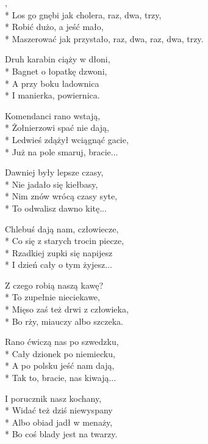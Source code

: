 \begin{lyrics}[longestline={Maszerować jak przystało, raz, dwa, raz, dwa, trzy.}]

,\\*
Los go gnębi jak cholera, raz, dwa, trzy,\\*
Robić dużo, a jeść mało,\\*
Maszerować jak przystało, raz, dwa, raz, dwa, trzy.

Druh karabin ciąży w dłoni,\\*
Bagnet o łopatkę dzwoni,\\*
A przy boku ładownica\\*
I manierka, powiernica.

Komendanci rano wstają,\\*
Żołnierzowi spać nie dają,\\*
Ledwieś zdążył wciągnąć gacie,\\*
Już na pole smaruj, bracie...

Dawniej były lepsze czasy,\\*
Nie jadało się kiełbasy,\\*
Nim znów wrócą czasy syte,\\*
To odwalisz dawno kitę...

Chlebuś dają nam, człowiecze,\\*
Co się z starych trocin piecze,\\*
Rzadkiej zupki się napijesz\\*
I dzień cały o tym żyjesz...

Z czego robią naszą kawę?\\*
To zupełnie nieciekawe,\\*
Mięso zaś też drwi z człowieka,\\*
Bo rży, miauczy albo szczeka.

Rano ćwiczą nas po szwedzku,\\*
Cały dzionek po niemiecku,\\*
A po polsku jeść nam dają,\\*
Tak to, bracie, nas kiwają...

I porucznik nasz kochany,\\*
Widać też dziś niewyspany\\*
Albo obiad jadł w menaży,\\*
Bo coś blady jest na twarzy.
\end{lyrics}




